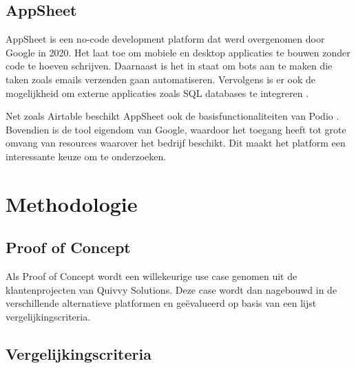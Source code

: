 \subsection{AppSheet}

AppSheet is een no-code development platform dat werd overgenomen door Google in 2020. Het laat toe om mobiele en desktop applicaties te bouwen zonder code te hoeven schrijven. Daarnaast is het in staat om bots aan te maken die taken zoals emails verzenden gaan automatiseren. Vervolgens is er ook de mogelijkheid om externe applicaties zoals SQL databases te integreren \autocite{AppSheet2020}. 

Net zoals Airtable beschikt AppSheet ook de basisfunctionaliteiten van Podio \autocite{AppSheet2020}. Bovendien is de tool eigendom van Google, waardoor het toegang heeft tot grote omvang van resources waarover het bedrijf beschikt. Dit maakt het platform een interessante keuze om te onderzoeken.

\section{Methodologie}%
\label{sec:methodologie}


\subsection{Proof of Concept}

Als Proof of Concept wordt een willekeurige use case genomen uit de klantenprojecten van Quivvy Solutions. Deze case wordt dan nagebouwd in de verschillende alternatieve platformen en geëvalueerd op basis van een lijst vergelijkingscriteria. 

\subsection{Vergelijkingscriteria}

